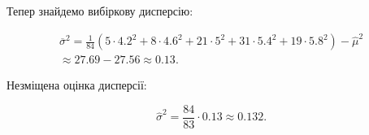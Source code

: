 \documentclass{hw_template}
\begin{document}
Тепер знайдемо вибіркову дисперсію:

\begin{align*}
    \overline{\sigma}^2 = \frac{1}{84} \left(5 \cdot 4.2^2 + 8 \cdot 4.6^2 + 21 \cdot 5^2 + 31 \cdot 5.4^2 + 19 \cdot 5.8^2\right) - \hat{\mu}^2 \\
    \approx 27.69 - 27.56 \approx 0.13.
\end{align*}

Незміщена оцінка дисперсії:

\begin{equation*}
    \hat{\sigma}^2 = \frac{84}{83} \cdot 0.13 \approx 0.132.
\end{equation*}
\end{document}
